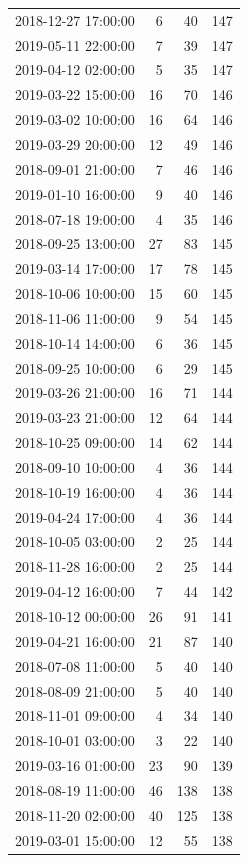 \begin{tabular}{lrrr}
2018-12-27 17:00:00 & 6 & 40 & 147 \\
2019-05-11 22:00:00 & 7 & 39 & 147 \\
2019-04-12 02:00:00 & 5 & 35 & 147 \\
2019-03-22 15:00:00 & 16 & 70 & 146 \\
2019-03-02 10:00:00 & 16 & 64 & 146 \\
2019-03-29 20:00:00 & 12 & 49 & 146 \\
2018-09-01 21:00:00 & 7 & 46 & 146 \\
2019-01-10 16:00:00 & 9 & 40 & 146 \\
2018-07-18 19:00:00 & 4 & 35 & 146 \\
2018-09-25 13:00:00 & 27 & 83 & 145 \\
2019-03-14 17:00:00 & 17 & 78 & 145 \\
2018-10-06 10:00:00 & 15 & 60 & 145 \\
2018-11-06 11:00:00 & 9 & 54 & 145 \\
2018-10-14 14:00:00 & 6 & 36 & 145 \\
2018-09-25 10:00:00 & 6 & 29 & 145 \\
2019-03-26 21:00:00 & 16 & 71 & 144 \\
2019-03-23 21:00:00 & 12 & 64 & 144 \\
2018-10-25 09:00:00 & 14 & 62 & 144 \\
2018-09-10 10:00:00 & 4 & 36 & 144 \\
2018-10-19 16:00:00 & 4 & 36 & 144 \\
2019-04-24 17:00:00 & 4 & 36 & 144 \\
2018-10-05 03:00:00 & 2 & 25 & 144 \\
2018-11-28 16:00:00 & 2 & 25 & 144 \\
2019-04-12 16:00:00 & 7 & 44 & 142 \\
2018-10-12 00:00:00 & 26 & 91 & 141 \\
2019-04-21 16:00:00 & 21 & 87 & 140 \\
2018-07-08 11:00:00 & 5 & 40 & 140 \\
2018-08-09 21:00:00 & 5 & 40 & 140 \\
2018-11-01 09:00:00 & 4 & 34 & 140 \\
2018-10-01 03:00:00 & 3 & 22 & 140 \\
2019-03-16 01:00:00 & 23 & 90 & 139 \\
2018-08-19 11:00:00 & 46 & 138 & 138 \\
2018-11-20 02:00:00 & 40 & 125 & 138 \\
2019-03-01 15:00:00 & 12 & 55 & 138 \\

\end{tabular}
